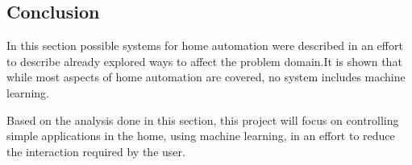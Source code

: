 \subsection{Conclusion}
In this section possible systems for home automation were described in an effort to describe already explored ways to affect the problem domain.It is shown that while most aspects of home automation are covered, no system includes machine learning.

Based on the analysis done in this section, this project will focus on controlling simple applications in the home, using machine learning, in an effort to reduce the interaction required by the user.
